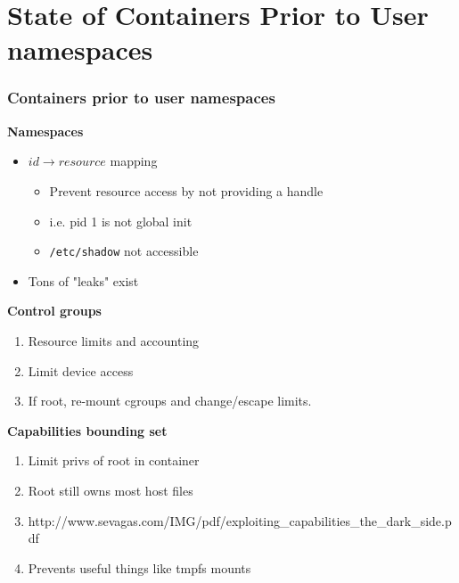 \documentclass{beamer}
\begin{document}
\section{State of Containers Prior to User namespaces} %
\begin{frame}
\frametitle{Containers prior to user namespaces}
\textbf{Namespaces}
\begin{itemize}
\item $id \rightarrow resource$ mapping
	\begin{itemize}
	\item Prevent resource access by not providing a handle
	\item i.e. pid 1 is not global init
	\item {\tt /etc/shadow} not accessible
	\end{itemize}
\item Tons of "leaks" exist
\end{itemize}

\textbf{Control groups}
\begin{enumerate}
\item Resource limits and accounting
\item Limit device access
\item If root, re-mount cgroups and change/escape limits.
\end{enumerate}

\vspace{.25in}

\textbf{Capabilities bounding set}
\begin{enumerate}
\item Limit privs of root in container
\item Root still owns most host files
\item {\tiny http://www.sevagas.com/IMG/pdf/exploiting\_capabilities\_the\_dark\_side.pdf}
\item Prevents useful things like tmpfs mounts
\end{enumerate}
\end{frame}
\end{document}
